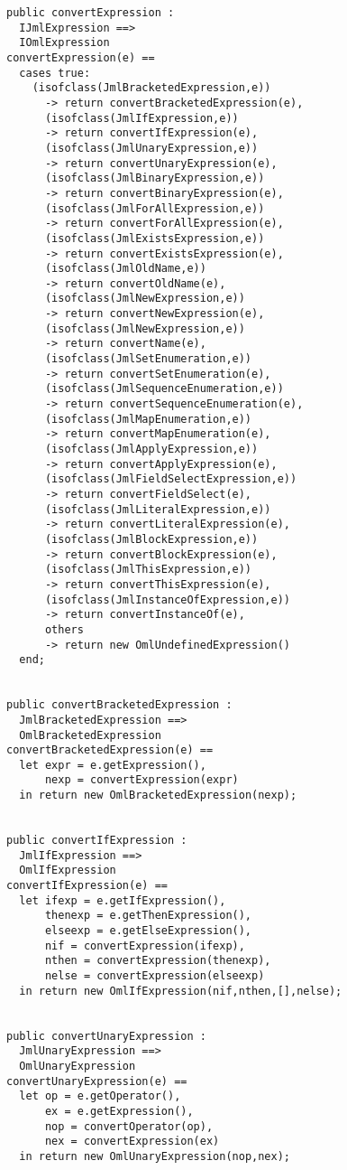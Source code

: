 \begin{lstlisting}
public convertExpression :
  IJmlExpression ==>
  IOmlExpression
convertExpression(e) ==  
  cases true:
    (isofclass(JmlBracketedExpression,e))
	  -> return convertBracketedExpression(e),
	  (isofclass(JmlIfExpression,e))
	  -> return convertIfExpression(e),
	  (isofclass(JmlUnaryExpression,e))
	  -> return convertUnaryExpression(e),
	  (isofclass(JmlBinaryExpression,e))
	  -> return convertBinaryExpression(e),
	  (isofclass(JmlForAllExpression,e))
	  -> return convertForAllExpression(e),
	  (isofclass(JmlExistsExpression,e))
	  -> return convertExistsExpression(e),
	  (isofclass(JmlOldName,e))
	  -> return convertOldName(e),
	  (isofclass(JmlNewExpression,e))
	  -> return convertNewExpression(e),
	  (isofclass(JmlNewExpression,e))
	  -> return convertName(e),
	  (isofclass(JmlSetEnumeration,e))
	  -> return convertSetEnumeration(e),
	  (isofclass(JmlSequenceEnumeration,e))
	  -> return convertSequenceEnumeration(e),
	  (isofclass(JmlMapEnumeration,e))
	  -> return convertMapEnumeration(e),
	  (isofclass(JmlApplyExpression,e))
	  -> return convertApplyExpression(e),
	  (isofclass(JmlFieldSelectExpression,e))
	  -> return convertFieldSelect(e),
	  (isofclass(JmlLiteralExpression,e))
	  -> return convertLiteralExpression(e),
	  (isofclass(JmlBlockExpression,e))
	  -> return convertBlockExpression(e),
	  (isofclass(JmlThisExpression,e))
	  -> return convertThisExpression(e),
	  (isofclass(JmlInstanceOfExpression,e))
	  -> return convertInstanceOf(e),
	  others
      -> return new OmlUndefinedExpression() 
  end;
  
  
public convertBracketedExpression :
  JmlBracketedExpression ==>
  OmlBracketedExpression
convertBracketedExpression(e) ==
  let expr = e.getExpression(),
      nexp = convertExpression(expr)
  in return new OmlBracketedExpression(nexp);
  
  
public convertIfExpression :
  JmlIfExpression ==>
  OmlIfExpression
convertIfExpression(e) ==
  let ifexp = e.getIfExpression(),
      thenexp = e.getThenExpression(),
	  elseexp = e.getElseExpression(),
	  nif = convertExpression(ifexp),
	  nthen = convertExpression(thenexp),
	  nelse = convertExpression(elseexp)
  in return new OmlIfExpression(nif,nthen,[],nelse);


public convertUnaryExpression :
  JmlUnaryExpression ==>
  OmlUnaryExpression
convertUnaryExpression(e) ==
  let op = e.getOperator(),
      ex = e.getExpression(),
	  nop = convertOperator(op),
	  nex = convertExpression(ex)
  in return new OmlUnaryExpression(nop,nex);



\end{lstlisting}

